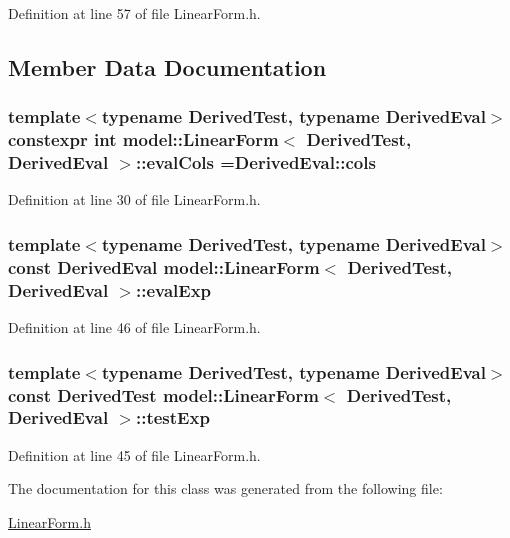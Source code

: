 Definition at line 57 of file Linear\+Form.\+h.



\subsection{Member Data Documentation}
\hypertarget{classmodel_1_1_linear_form_a0e22c8a17afa5808bdb5b24d439bc098}{}
\subsubsection[{eval\+Cols}]{\setlength{\rightskip}{0pt plus 5cm}template$<$typename Derived\+Test, typename Derived\+Eval$>$ constexpr int {\bf model\+::\+Linear\+Form}$<$ Derived\+Test, Derived\+Eval $>$\+::eval\+Cols =Derived\+Eval\+::cols\hspace{0.3cm}{\ttfamily [static]}}\label{classmodel_1_1_linear_form_a0e22c8a17afa5808bdb5b24d439bc098}


Definition at line 30 of file Linear\+Form.\+h.

\hypertarget{classmodel_1_1_linear_form_a06d51fa5037e2f3859d6669e14de8ede}{}
\subsubsection[{eval\+Exp}]{\setlength{\rightskip}{0pt plus 5cm}template$<$typename Derived\+Test, typename Derived\+Eval$>$ const Derived\+Eval {\bf model\+::\+Linear\+Form}$<$ Derived\+Test, Derived\+Eval $>$\+::eval\+Exp}\label{classmodel_1_1_linear_form_a06d51fa5037e2f3859d6669e14de8ede}


Definition at line 46 of file Linear\+Form.\+h.

\hypertarget{classmodel_1_1_linear_form_aeeaabdba14b8723c7bd158c7c14e7ce5}{}
\subsubsection[{test\+Exp}]{\setlength{\rightskip}{0pt plus 5cm}template$<$typename Derived\+Test, typename Derived\+Eval$>$ const Derived\+Test {\bf model\+::\+Linear\+Form}$<$ Derived\+Test, Derived\+Eval $>$\+::test\+Exp}\label{classmodel_1_1_linear_form_aeeaabdba14b8723c7bd158c7c14e7ce5}


Definition at line 45 of file Linear\+Form.\+h.



The documentation for this class was generated from the following file\+:\begin{DoxyCompactItemize}
\item 
\hyperlink{_linear_form_8h}{Linear\+Form.\+h}\end{DoxyCompactItemize}
